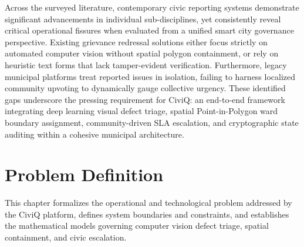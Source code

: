 \documentclass[12pt,a4paper]{report}
\begin{document}
Across the surveyed literature, contemporary civic reporting systems demonstrate significant advancements in individual sub-disciplines, yet consistently reveal critical operational fissures when evaluated from a unified smart city governance perspective. Existing grievance redressal solutions either focus strictly on automated computer vision without spatial polygon containment, or rely on heuristic text forms that lack tamper-evident verification. Furthermore, legacy municipal platforms treat reported issues in isolation, failing to harness localized community upvoting to dynamically gauge collective urgency. These identified gaps underscore the pressing requirement for CiviQ: an end-to-end framework integrating deep learning visual defect triage, spatial Point-in-Polygon ward boundary assignment, community-driven SLA escalation, and cryptographic state auditing within a cohesive municipal architecture.


\chapter{Problem Definition}

This chapter formalizes the operational and technological problem addressed by the CiviQ platform, defines system boundaries and constraints, and establishes the mathematical models governing computer vision defect triage, spatial containment, and civic escalation.
\end{document}

